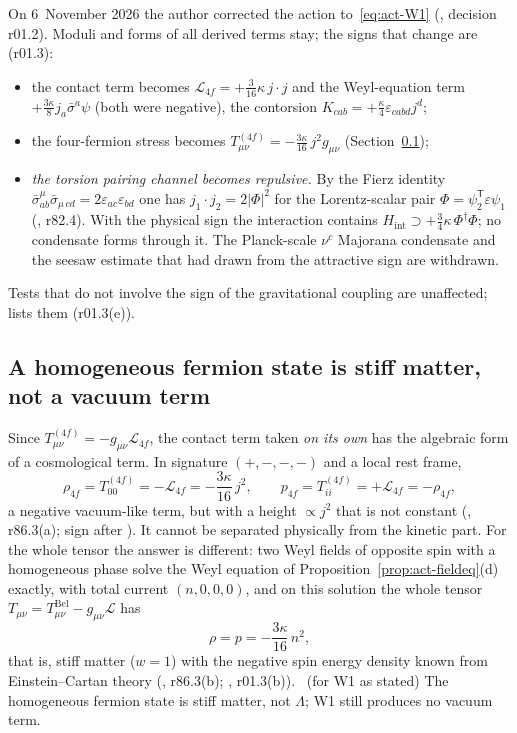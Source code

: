 On 6~November 2026 the author corrected the action to~\eqref{eq:act-W1} (, decision r01.2). Moduli and forms of
all derived terms stay; the signs that change are (r01.3):
\begin{itemize}
\item the contact term becomes $\mathcal L_{4f}=+\tfrac3{16}\kappa\,j\cdot j$ and the Weyl-equation term
  $+\tfrac{3\kappa}{8}j_a\bar\sigma^a\psi$ (both were negative), the contorsion $K_{cab}=+\tfrac\kappa4\varepsilon_{cabd}j^d$;
\item the four-fermion stress becomes $T^{(4f)}_{\mu\nu}=-\tfrac{3\kappa}{16}\,j^2g_{\mu\nu}$ (Section~\ref{sec:act-stiff});
\item \emph{the torsion pairing channel becomes repulsive.} By the Fierz identity
  $\bar\sigma^\mu_{ab}\bar\sigma_{\mu\,cd}=2\varepsilon_{ac}\varepsilon_{bd}$ one has $j_1\cdot j_2=2|\Phi|^2$ for the Lorentz-scalar pair
  $\Phi=\psi_2^{\mathsf T}\varepsilon\psi_1$ (, r82.4). With the physical sign the interaction contains
  $H_{\mathrm{int}}\supset+\tfrac34\kappa\,\Phi^\dagger\Phi$; no condensate forms through it. The Planck-scale $\nu^c$
  Majorana condensate and the seesaw estimate that  had drawn from the attractive sign are withdrawn.
\end{itemize}
Tests that do not involve the sign of the gravitational coupling are unaffected;  lists them (r01.3(e)).

\subsection{A homogeneous fermion state is stiff matter, not a vacuum term}
\label{sec:act-stiff}

Since $T^{(4f)}_{\mu\nu}=-g_{\mu\nu}\mathcal L_{4f}$, the contact term taken \emph{on its own} has the algebraic form of a
cosmological term. In signature $(+,-,-,-)$ and a local rest frame,
\begin{equation}
\rho_{4f}=T^{(4f)}_{00}=-\mathcal L_{4f}=-\frac{3\kappa}{16}\,j^2,\qquad
p_{4f}=T^{(4f)}_{ii}=+\mathcal L_{4f}=-\rho_{4f},
\label{eq:act-4f-stress}
\end{equation}
a negative vacuum-like term, but with a height $\propto j^2$ that is not constant (, r86.3(a); sign after
). It cannot be separated physically from the kinetic part. For the whole tensor the answer is different:
two Weyl fields of opposite spin with a homogeneous phase solve the Weyl equation of
Proposition~\ref{prop:act-fieldeq}(d) exactly, with total current $(n,0,0,0)$, and on this solution the whole tensor
$T_{\mu\nu}=T^{\mathrm{Bel}}_{\mu\nu}-g_{\mu\nu}\mathcal L$ has
\begin{equation}
\rho=p=-\frac{3\kappa}{16}\,n^2 ,
\label{eq:act-stiff}
\end{equation}
that is, stiff matter ($w=1$) with the negative spin energy density known from Einstein--Cartan theory (,
r86.3(b); , r01.3(b)). \Established\ (for W1 as stated) The homogeneous fermion state is stiff matter, not
$\Lambda$; W1 still produces no vacuum term.

